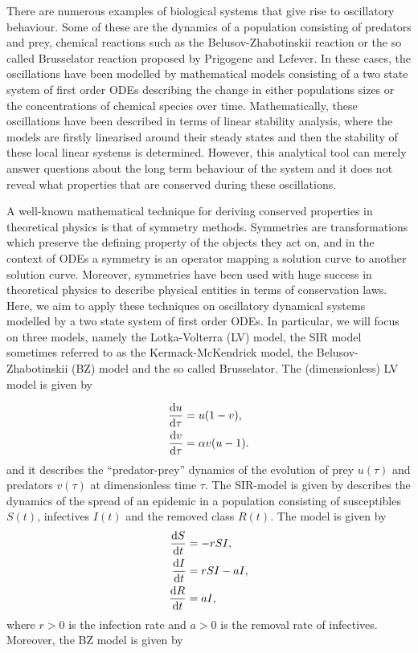 There are numerous examples of biological systems that give rise to oscillatory behaviour. Some of these are the dynamics of a population consisting of predators and prey, chemical reactions such as the Belusov-Zhabotinskii reaction or the so called Brusselator reaction proposed by Prigogene and Lefever. In these cases, the oscillations have been modelled by mathematical models consisting of a two state system of first order ODEs describing the change in either populations sizes or the concentrations of chemical species over time. Mathematically, these oscillations have been described in terms of linear stability analysis, where the models are firstly linearised around their steady states and then the stability of these local linear systems is determined. However, this analytical tool can merely answer questions about the long term behaviour of the system and it does not reveal what properties that are conserved during these oscillations.

A well-known mathematical technique for deriving conserved properties in theoretical physics is that of symmetry methods. Symmetries are transformations which preserve the defining property of the objects they act on, and in the context of ODEs a symmetry is an operator mapping a solution curve to another solution curve. Moreover, symmetries have been used with huge success in theoretical physics to describe physical entities in terms of conservation laws. Here, we aim to apply these techniques on oscillatory dynamical systems modelled by a two state system of first order ODEs. In particular, we will focus on three models, namely the Lotka-Volterra (LV) model, the SIR model sometimes referred to as the Kermack-McKendrick model, the Belusov-Zhabotinskii (BZ) model and the so called Brusselator. The (dimensionless) LV model is given by 

\begin{equation}
  \begin{split}
    \dv{u}{\tau}&=u(1-v),\\
    \dv{v}{\tau}&=\alpha v(u-1).\\    
    \end{split}
  \label{eq:LV}
\end{equation}
and it describes the ``predator-prey'' dynamics of the evolution of prey $u(\tau)$ and predators $v(\tau)$ at dimensionless time $\tau$. The SIR-model is given by describes the dynamics of the spread of an epidemic in a population consisting of susceptibles $S(t)$, infectives $I(t)$ and the removed class $R(t)$. The model is given by
\begin{equation}
  \begin{split}
    \dv{S}{t}&=-rSI,\\
    \dv{I}{t}&=rSI-aI,\\
    \dv{R}{t}&=aI,\\
    \end{split}
  \label{eq:SIR}
\end{equation}
where $r>0$ is the infection rate and $a>0$ is the removal rate of infectives. Moreover, the BZ model is given by

